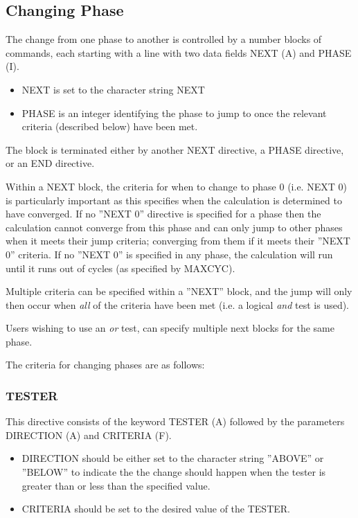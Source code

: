 \documentclass[11pt,fleqn]{article}
\begin{document}
\subsection[Changing Phase]{Changing Phase}
The change from one phase to another is controlled by a number blocks of
commands, each starting with a line with two data fields NEXT (A) and PHASE
(I).

\begin{itemize}
\item NEXT is set to the character string NEXT
\item PHASE is an integer identifying the phase to jump to once the
  relevant criteria (described below) have been met.
\end{itemize}

The block is terminated either by another NEXT directive, a PHASE
directive, or an END directive.

Within a NEXT block, the criteria for when to change to phase 0
(i.e. NEXT 0) is particularly important
as this specifies when the calculation is determined to have
converged. If no ''NEXT 0'' directive is specified for a phase then
the calculation cannot converge from this phase and can only jump to
other phases when it meets their jump criteria; converging from them if it
meets their ''NEXT 0'' criteria. If no ''NEXT 0'' is specified in any
phase, the calculation will run until it runs out of cycles (as
specified by MAXCYC).

Multiple criteria can be specified within a ''NEXT'' block, and the
jump will only then occur when \emph{all} of the criteria have been
met (i.e. a logical \emph{and} test is used).

Users wishing to use an \emph{or} test, can specify multiple next
blocks for the same phase.

The criteria for changing phases are as follows:

\subsubsection[TESTER]{TESTER}
This directive consists of the keyword TESTER (A) followed
by the parameters DIRECTION (A) and CRITERIA (F).

\begin{itemize}
\item DIRECTION should be either set to the character string ''ABOVE'' or
  ''BELOW'' to indicate the the change should happen when the tester is
  greater than or less than the specified value.
\item CRITERIA should be set to the desired value of the TESTER.
\end{itemize}
\end{document}
